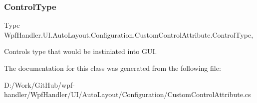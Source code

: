 \subsubsection{\texorpdfstring{Control\+Type}{ControlType}}
{\footnotesize\ttfamily Type Wpf\+Handler.\+U\+I.\+Auto\+Layout.\+Configuration.\+Custom\+Control\+Attribute.\+Control\+Type\hspace{0.3cm}{\ttfamily [get]}, {\ttfamily [set]}}



Control\textquotesingle{}s type that would be instiniated into G\+UI. 



The documentation for this class was generated from the following file\+:\begin{DoxyCompactItemize}
\item 
D\+:/\+Work/\+Git\+Hub/wpf-\/handler/\+Wpf\+Handler/\+U\+I/\+Auto\+Layout/\+Configuration/Custom\+Control\+Attribute.\+cs\end{DoxyCompactItemize}
